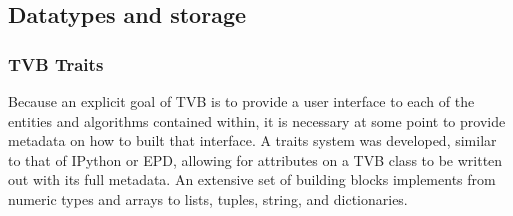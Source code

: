 %
%
%
%
%
%


\subsection{Datatypes and storage}

\subsubsection{TVB Traits}

Because an explicit goal of TVB is to provide a user interface to each of the
entities and algorithms contained within, it is necessary at some point to
provide metadata on how to built that interface. A traits system was
developed, similar to that of IPython or EPD, allowing for
attributes on a TVB class to be written out with its full metadata. An extensive
set of building blocks implements from numeric types and arrays to
lists, tuples, string, and dictionaries.

